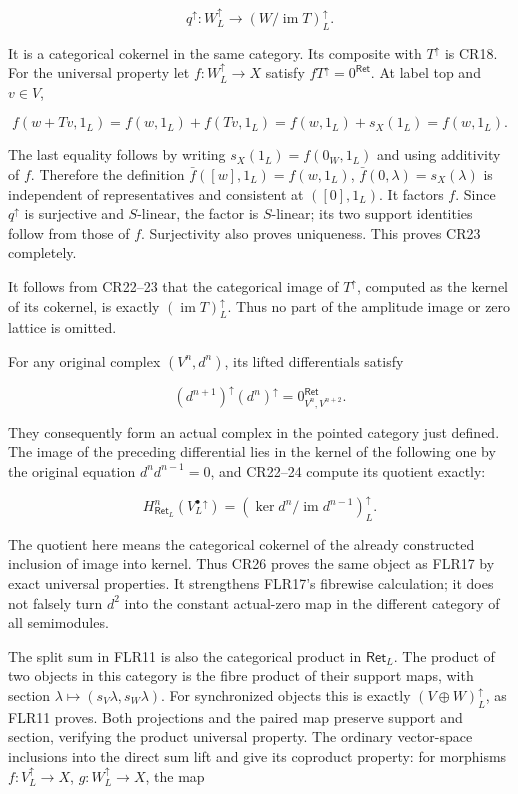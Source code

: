 \documentclass[11pt]{article}
\begin{document}
\[
q^\uparrow:W^\uparrow_L\longrightarrow(W/\operatorname{im}T)^\uparrow_L.
\tag{CR23}
\]

It is a categorical cokernel in the same category. Its composite with \(T^\uparrow\) is CR18. For the universal property let \(f:W^\uparrow_L\to X\) satisfy \(fT^\uparrow=0^{\mathsf{Ret}}\). At label top and \(v\in V\),

\[
f(w+Tv,1_L)=f(w,1_L)+f(Tv,1_L)
 =f(w,1_L)+s_X(1_L)=f(w,1_L).
\tag{CR24}
\]

The last equality follows by writing \(s_X(1_L)=f(0_W,1_L)\) and using additivity of \(f\). Therefore the definition \(\bar f([w],1_L)=f(w,1_L)\), \(\bar f(0,\lambda)=s_X(\lambda)\) is independent of representatives and consistent at \(([0],1_L)\). It factors \(f\). Since \(q^\uparrow\) is surjective and \(S\)-linear, the factor is \(S\)-linear; its two support identities follow from those of \(f\). Surjectivity also proves uniqueness. This proves CR23 completely.

It follows from CR22--23 that the categorical image of \(T^\uparrow\), computed as the kernel of its cokernel, is exactly \((\operatorname{im}T)^\uparrow_L\). Thus no part of the amplitude image or zero lattice is omitted.

For any original complex \((V^n,d^n)\), its lifted differentials satisfy

\[
(d^{n+1})^\uparrow(d^n)^\uparrow
 =0^{\mathsf{Ret}}_{V^n,V^{n+2}}.
\tag{CR25}
\]

They consequently form an actual complex in the pointed category just defined. The image of the preceding differential lies in the kernel of the following one by the original equation \(d^nd^{n-1}=0\), and CR22--24 compute its quotient exactly:

\[
H^n_{\mathsf{Ret}_L}(V^\bullet_L{}^\uparrow)
 =\left(\ker d^n/\operatorname{im}d^{n-1}\right)^\uparrow_L.
\tag{CR26}
\]

The quotient here means the categorical cokernel of the already constructed inclusion of image into kernel. Thus CR26 proves the same object as FLR17 by exact universal properties. It strengthens FLR17's fibrewise calculation; it does not falsely turn \(d^2\) into the constant actual-zero map in the different category of all semimodules.

The split sum in FLR11 is also the categorical product in \(\mathsf{Ret}_L\). The product of two objects in this category is the fibre product of their support maps, with section \(\lambda\mapsto(s_V\lambda,s_W\lambda)\). For synchronized objects this is exactly \((V\oplus W)^\uparrow_L\), as FLR11 proves. Both projections and the paired map preserve support and section, verifying the product universal property. The ordinary vector-space inclusions into the direct sum lift and give its coproduct property: for morphisms \(f:V^\uparrow_L\to X\), \(g:W^\uparrow_L\to X\), the map
\end{document}

